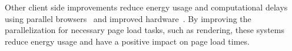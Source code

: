 Other client side improvements reduce energy usage and computational
delays using parallel browsers~\cite{mai2012hotpar, meyerovich2010www}
and improved hardware~\cite{zhu2013hpca}.  By improving the
parallelization for necessary page load tasks, such as rendering,
these systems reduce energy usage and have a positive impact on page
load times. 


